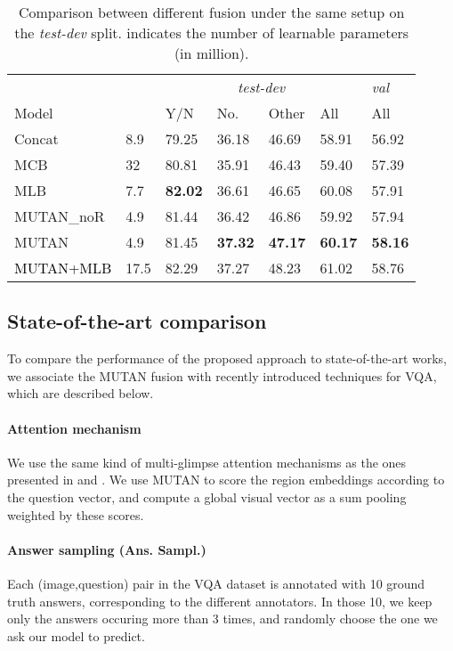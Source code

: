 \documentclass[10pt,twocolumn,letterpaper]{article}
\begin{document}
\begin{table}[]
\begin{tabularx}{\columnwidth}{lX*{4}{X}X}
&&\multicolumn{4}{c}{\textit{test-dev}} & \textit{val} \\
\cmidrule{3-6} \cmidrule{7-7}
Model &  & Y/N & No. & Other & All & All\\ 
\hline
Concat & 8.9 & 79.25 & 36.18 & 46.69 & 58.91 & 56.92\\ 
MCB & 32 & 80.81 & 35.91 & 46.43 & 59.40 & 57.39 \\ 
 MLB & 7.7 & \textbf{82.02} & 36.61 & 46.65 & 60.08 & 57.91\\ 
 MUTAN\_noR & 4.9 & 81.44 & 36.42 & 46.86 & 59.92 & 57.94\\ 
MUTAN & 4.9 & 81.45 & \textbf{37.32} & \textbf{47.17} & \textbf{60.17} & \textbf{58.16}\\
\hline
\hline
\textcolor{black}{MUTAN+MLB} & 17.5 & 82.29 & 37.27 & 48.23 & 61.02 & 58.76 \\

\bottomrule
\end{tabularx}
\caption{\label{fusion_compare:testdev} Comparison between different fusion under the same setup on the \textit{test-dev} split.  indicates the number of learnable parameters (in million).}  
\end{table}

\subsection{State-of-the-art comparison} 
\label{final_system}


To compare the performance of the proposed approach to state-of-the-art works, we associate the MUTAN fusion with recently introduced techniques for VQA, which are described below.

\vspace{-0.4cm}
\paragraph{Attention mechanism}
We use the same kind of multi-glimpse attention mechanisms as the ones presented in \cite{fukui16mcb} and \cite{Kim2017}. We use MUTAN to score the region embeddings according to the question vector, and compute a global visual vector as a sum pooling weighted by these scores.
\vspace{-0.4cm}
\paragraph{Answer sampling (Ans. Sampl.)}
Each (image,question) pair in the VQA dataset is annotated with 10 ground truth answers, corresponding to the different annotators. In those 10, we keep only the answers occuring more than 3 times, and randomly choose the one we ask our model to predict. 
\vspace{-0.4cm}
\end{document}

